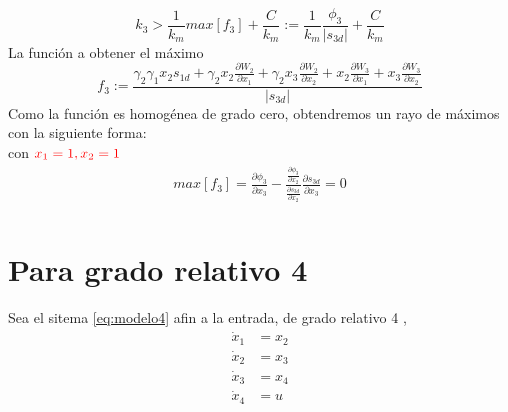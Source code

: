 \begin{equation}
  k_3> \frac{1}{k_m} max \left[  f_3 \right]+\frac{C}{k_m}:=\frac{1}{k_m}\frac{\phi_3}{|s_{3d}|}+\frac{C}{k_m}
\end{equation}
La función a obtener el máximo
\begin{equation}
  f_3:= \frac{\gamma_2 \gamma_1 x_2 s_{1d}   + \gamma_2  x_2  \frac{\partial W_2}{\partial x_1} + \gamma_2 x_3 \frac{\partial W_2}{\partial x_2}   + x_2 \frac{\partial W_3}{\partial x_1}  + x_3 \frac{\partial W_3}{\partial x_2}}{|s_{3d}|}
\end{equation}
Como la función es homogénea de grado cero, obtendremos un rayo de máximos con la siguiente forma:\\
con $\textcolor{red}{x_1=1, x_2=1}$
\begin{equation}
  \begin{split}
    max \left[  f_3 \right]=\frac{\partial \phi_3}{\partial x_3}- \frac{ \frac{\partial \phi_3}{\partial x_2}}{\frac{\partial s_{3d}}{\partial x_2}}\frac{\partial s_{3d}}{\partial x_3}=0\\
  \end{split}
\end{equation}



\section{Para grado relativo 4}
Sea el sitema \ref{eq:modelo4} afin a la entrada, de grado relativo 4 , 
\begin{subequations}\label{eq:modelo4}
  \begin{align}\label{eq:modelo1a}
    \dot{x}_1&=x_2 \\
    \dot{x}_2&=x_3 \\
    \dot{x}_3&=x_4 \\
    \dot{x}_4&=u
  \end{align}
\end{subequations}


